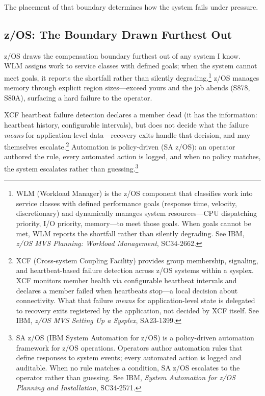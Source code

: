 \documentclass[11pt]{article}
\begin{document}
The placement of that boundary determines how the system fails under pressure.

\subsection{z/OS: The Boundary Drawn Furthest Out}

z/OS draws the compensation boundary furthest out of any system I know. WLM
assigns work to service classes with defined goals; when the system cannot meet
goals, it reports the shortfall rather than silently
degrading.\footnote{WLM (Workload Manager) is the z/OS component that classifies
work into service classes with defined performance goals (response time,
velocity, discretionary) and dynamically manages system resources---CPU
dispatching priority, I/O priority, memory---to meet those goals. When goals
cannot be met, WLM reports the shortfall rather than silently degrading. See
IBM, \emph{z/OS MVS Planning: Workload Management}, SC34-2662.} z/OS manages
memory through explicit region sizes---exceed yours and the job abends (S878,
S80A), surfacing a hard failure to the operator.

XCF heartbeat failure detection declares a member dead (it has the information:
heartbeat history, configurable intervals), but does not decide what the failure
\emph{means} for application-level data---recovery exits handle that decision,
and may themselves escalate.\footnote{XCF (Cross-system Coupling Facility)
provides group membership, signaling, and heartbeat-based failure detection
across z/OS systems within a sysplex. XCF monitors member health via
configurable heartbeat intervals and declares a member failed when heartbeats
stop---a local decision about connectivity. What that failure \emph{means} for
application-level state is delegated to recovery exits registered by the
application, not decided by XCF itself. See IBM, \emph{z/OS MVS Setting Up a
Sysplex}, SA23-1399.} Automation is policy-driven (SA z/OS): an operator
authored the rule, every automated action is logged, and when no policy matches,
the system escalates rather than guessing.\footnote{SA z/OS (IBM System
Automation for z/OS) is a policy-driven automation framework for z/OS
operations. Operators author automation rules that define responses to system
events; every automated action is logged and auditable. When no rule matches a
condition, SA z/OS escalates to the operator rather than guessing. See IBM,
\emph{System Automation for z/OS Planning and Installation}, SC34-2571.}
\end{document}
